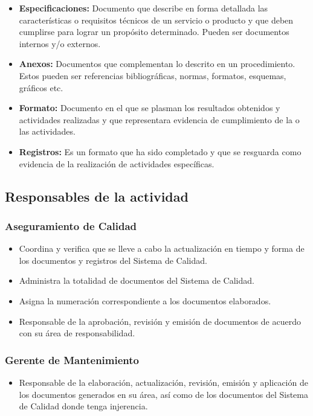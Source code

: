 \begin{itemize}
	\item \textbf{Especificaciones:} Documento que describe en forma detallada las características o requisitos técnicos de un servicio o producto y que deben cumplirse para lograr un propósito determinado. Pueden ser documentos internos y/o externos.
	\item \textbf{Anexos:} Documentos que complementan lo descrito en un procedimiento. Estos pueden ser referencias bibliográficas, normas, formatos, esquemas, gráficos etc.
	\item \textbf{Formato:} Documento en el que se plasman los resultados obtenidos y actividades realizadas y que representara evidencia de cumplimiento de la o las actividades.
	\item \textbf{Registros:} Es un formato que ha sido completado y que se resguarda como evidencia de la realización de actividades específicas.
\end{itemize}

\subsection{Responsables de la actividad}
\subsubsection{Aseguramiento de Calidad}
\begin{itemize}
	\item Coordina y verifica que se lleve a cabo la actualización en tiempo y forma de los documentos y registros del Sistema de Calidad.
	\item Administra la totalidad de documentos del Sistema de Calidad.
	\item Asigna la numeración correspondiente a los documentos elaborados.
	\item Responsable de la aprobación, revisión y emisión de documentos de acuerdo con su área de responsabilidad.
\end{itemize}

\subsubsection{Gerente de Mantenimiento}
\begin{itemize}
	\item Responsable de la elaboración, actualización, revisión, emisión y aplicación de los documentos generados en su área, así como de los documentos del Sistema de Calidad donde tenga injerencia.
\end{itemize}

